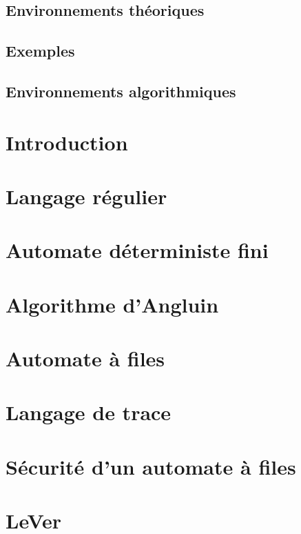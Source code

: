 

\newcommand{\student}{Benjamin André}
\newcommand{\grade}{MAB2 Sciences Informatiques}
\newcommand{\director}{Véronique Bruyère}
\renewcommand{\title}{Vérification de la sécurité d'automates à file par apprentissage actif}
\renewcommand{\date}{\today}



	

	\tableofcontents
	\newpage

	\section*{Environnements théoriques}

	\section*{Exemples}

	\section*{Environnements algorithmiques}

	\newpage

	\chapter{Introduction}\label{intro}
	\chapter{Langage régulier}\label{lr}
	\chapter{Automate déterministe fini}\label{adf}
	\chapter{Algorithme d'Angluin}\label{l*}
	\chapter{Automate à files}\label{fifo}
	\chapter{Langage de trace}\label{trace}
	\chapter{Sécurité d'un automate à files}\label{wl}
	\chapter{LeVer}\label{lever}

	\newpage
	
	

	\appendix


